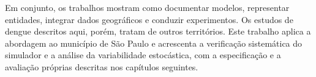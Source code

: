 Em conjunto, os trabalhos mostram como documentar modelos, representar entidades, integrar dados geográficos e conduzir experimentos. Os estudos de dengue descritos aqui, porém, tratam de outros territórios. Este trabalho aplica a abordagem ao município de São Paulo e acrescenta a verificação sistemática do simulador e a análise da variabilidade estocástica, com a especificação e a avaliação próprias descritas nos capítulos seguintes.